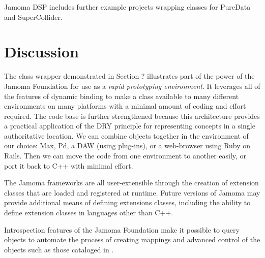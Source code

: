 \documentclass[twoside,10pt]{article}
\begin{document}
Jamoma DSP includes further example projects wrapping classes for PureData and SuperCollider.




\section{Discussion} %



The class wrapper demonstrated in Section ? illustrates part of the power of the Jamoma Foundation for use as a \emph{rapid prototyping environment}.  It leverages all of the features of dynamic binding to make a class available to many different environments on many platforms with a minimal amount of coding and effort required.  The code base is further strengthened because this architecture provides a practical application of the DRY principle for representing concepts in a single authoritative location.  We can combine objects together in the environment of our choice: Max, Pd, a DAW (using plug-ins), or a web-browser using Ruby on Rails.  Then we can move the code from one environment to another easily, or port it back to C++ with minimal effort.

The Jamoma frameworks are all user-extensible through the creation of extension classes that are loaded and registered at runtime.  Future versions of Jamoma may provide additional means of defining extensions classes, including the ability to define extension classes in languages other than C++.

Introspection features of the Jamoma Foundation make it possible to query objects to automate the process of creating mappings and advanced control of the objects such as those cataloged in \cite{Pendharkar:2006}.  
\end{document}
